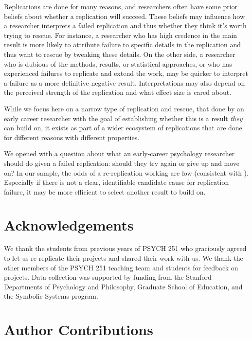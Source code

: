 \documentclass[
  english,
  a4paper,
]{article}
\begin{document}
Replications are done for many reasons, and researchers often have some prior beliefs about whether a replication will succeed.
These beliefs may influence how a researcher interprets a failed replication and thus whether they think it's worth trying to rescue.
For instance, a researcher who has high credence in the main result is more likely to attribute failure to specific details in the replication and thus want to rescue by tweaking these details.
On the other side, a researcher who is dubious of the methods, results, or statistical approaches, or who has experienced failures to replicate and extend the work, may be quicker to interpret a failure as a more definitive negative result.
Interpretations may also depend on the perceived strength of the replication and what effect size is cared about.

While we focus here on a narrow type of replication and rescue, that done by an early career researcher with the goal of establishing whether this is a result \emph{they} can build on, it exists as part of a wider ecosystem of replications that are done for different reasons with different properties.

We opened with a question about what an early-career psychology researcher should do given a failed replication: should they try again or give up and move on?
In our sample, the odds of a re-replication working are low (consistent with ).
Especially if there is not a clear, identifiable candidate cause for replication failure, it may be more efficient to select another result to build on.

\section*{Acknowledgements}\label{acknowledgements}

We thank the students from previous years of PSYCH 251 who graciously agreed to let us re-replicate their projects and shared their work with us.
We thank the other members of the PSYCH 251 teaching team and students for feedback on projects.
Data collection was supported by funding from the Stanford Departments of Psychology and Philosophy, Graduate School of Education, and the Symbolic Systems program.

\section*{Author Contributions}\label{author-contributions}
\end{document}
